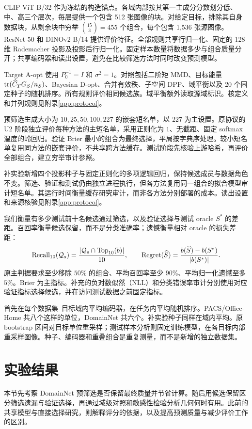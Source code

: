 CLIP ViT-B/32\citep{radford2021} 作为冻结的构造锚点。各域内部按其第一主成分分数划分低、中、高三个层次，每层提供一个包含 512 张图像的块。对给定目标，排除其自身数据块，从剩余块中穷举 $\binom{15}{3}=455$ 个组合，每个包含 1,536 张源图像。ResNet-50 和 DINOv2-B/14 提供评价特征\citep{he2016,oquab2024}。全部规则共享行归一化、固定的 128 维 Rademacher 投影及投影后行归一化。固定样本数量将数据多少与组合质量分开；共享编码器和读出设置，避免在比较筛选方法时同时改变预测模型。

Target A-opt 使用 $P_0^{-1}=I$ 和 $\sigma^2=1$。对照包括二阶矩 MMD、目标能量 $\operatorname{tr}(\widehat C_TG_S/n_S)$、Bayesian D-opt、合并有效秩、子空间 DPP、域平衡以及 20 个固定种子的随机排序。所有规则评价相同候选族。域平衡额外读取源域标识。核定义和并列规则见附录\ref{app:protocol}。

预筛选生成大小为 $10,25,50,100,227$ 的嵌套短名单，以 $227$ 为主设置。原协议的 U2 阶段独立评价每种方法的主短名单，采用正则化为 $1$、无截距、固定 softmax 温度的岭回归。验证 Brier 最小的组合为最终选择，平局按字典序处理。较小短名单复用同方法的嵌套评价，不共享跨方法缓存。测试阶段先核验上游哈希，再评价全部组合，建立穷举审计参照。

补实验新增四个投影种子与固定正则化的多项逻辑回归，保持候选成员与数据角色不变。筛选、验证和测试仍由独立进程执行，但各方法复用同一组合的拟合模型审计短名单。其运行时间衡量缓存研究审计，而非各方法分别部署的成本。读出设置和来源核验见附录\ref{app:protocol}。

我们衡量有多少测试前十名候选通过筛选，以及验证选择与测试 oracle $S^*$ 的差距。召回率衡量候选保留，而不是分类准确率；遗憾衡量相对 oracle 的损失差距：
\begin{equation}
 \mathrm{Recall}_{10}(\mathcal{Q}_s)=\frac{|\mathcal{Q}_s\cap\mathrm{Top}_{10}(b)|}{10},\qquad
 \mathrm{Regret}(\widehat S)=\frac{b(\widehat S)-b(S^*)}{|b(S^*)|}.
 \label{eq:metrics}
\end{equation}
原主判据要求至少移除 $50\%$ 的组合、平均召回率至少 $90\%$、平均归一化遗憾至多 $5\%$。Brier 为主指标。补充的负对数似然（NLL）和分类错误率审计分别使用对应验证指标选择候选，并在访问测试数据之前固定指标。

首先在每个数据集--目标域内平均编码器，在任务内平均随机排序。PACS/Office-Home 共八个这样的单位，DomainNet 共六个。补实验种子同样在域内平均。原 bootstrap 区间对目标单位重采样；测试样本分析则固定训练模型，在各目标内部重采样图像。种子、编码器和重叠组合是重复测量，而不是新增的独立数据集。

\section{实验结果}
\label{sec:results}
本节先考察 DomainNet 预筛选是否保留最终质量并节省计算。随后用候选保留区分筛选遗漏与验证选择，再通过域级对照和敏感性检验分析几何何时有用。此前的共享模型与直接选择研究，则解释评分的依据，以及提高预测质量与减少评价工作的区别。

